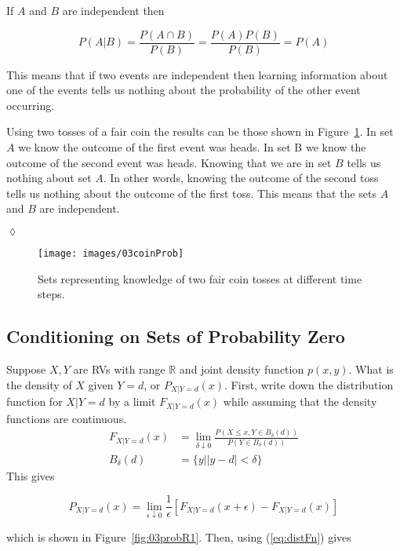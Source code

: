 If $A$ and $B$ are independent then

\begin{equation*}
P(A|B) = \frac{P(A\cap B)}{P(B)} = \frac{P(A)P(B)}{P(B)} = P(A)
\end{equation*}

This means that if two events are independent then learning information about one of the events tells us nothing about the probability of the other event occurring.

\begin{example}
Using two tosses of a fair coin the results can be those shown in Figure~\ref{fig:03coinProb}.
In set $A$ we know the outcome of the first event was heads.
In set B we know the outcome of the second event was heads.
Knowing that we are in set $B$ tells us nothing about set $A$.
In other words, knowing the outcome of the second toss tells us nothing about the outcome of the first toss.
This means that the sets $A$ and $B$ are independent.
\end{example}
$\lozenge$

\begin{figure}[ht!]
\centering
\texttt{[image: images/03coinProb]}
\caption{Sets representing knowledge of two fair coin tosses at different time steps.}%
\label{fig:03coinProb}
\end{figure}

\subsection{Conditioning on Sets of Probability Zero}
Suppose $X,Y$ are RVs with range $\mathbb{R}$ and joint density function $p(x,y)$.
What is the density of $X$ given $Y=d$, or $P_{X|Y=d}(x)$.
First, write down the distribution function for $X|Y=d$ by a limit $F_{X|Y=d}(x)$ while assuming that the density functions are continuous.
\begin{align}
\label{eq:distFn}
F_{X|Y=d}(x) &= \lim_{\delta\downarrow 0}\frac{P(X\leq x, Y\in B_\delta(d))}{P(Y\in B_\delta(d))} \\
B_\delta(d) &= \{y | |y-d| < \delta\} \nonumber
\end{align}
This gives

\begin{equation*}
P_{X|Y=d}(x) = \lim_{\epsilon\downarrow 0}\frac{1}{\epsilon}[F_{X|Y=d}(x+\epsilon) - F_{X|Y=d}(x)]
\end{equation*}

which is shown in Figure~\ref{fig:03probR1}.
Then, using (\ref{eq:distFn}) gives

